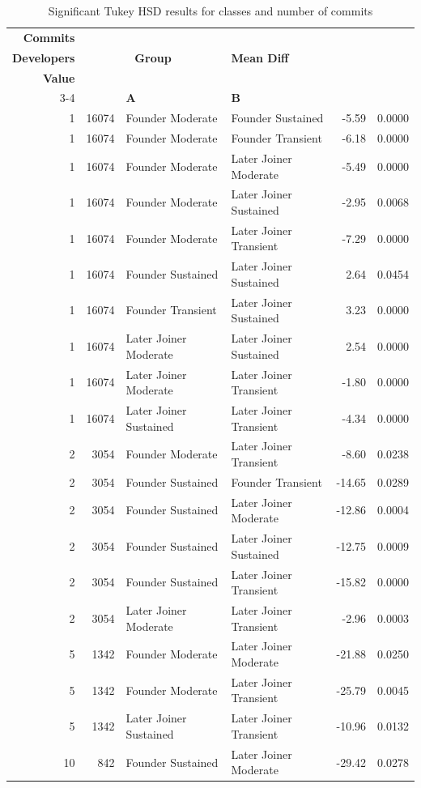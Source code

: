 \begin{table}[H]
\centering
\setlength{\tabcolsep}{2pt}
\caption[Significant Tukey HSD Results for classes]{Significant Tukey HSD results for classes and number of commits}
\begin{tabular}{r r l l r r}
\toprule
\textbf{Commits} & \makecell[t]{\textbf{Number of}\\\textbf{Developers}} & \multicolumn{2}{c}{\textbf{Group}} & \textbf{Mean Diff} & \makecell[t]{\textbf{Adj $P$}\\\textbf{Value}} \\ 
\cmidrule(lr){3-4}
 &  & \textbf{A} & \textbf{B} &  &  \\ 
\midrule
1 & 16074 & Founder Moderate & Founder Sustained & -5.59 & 0.0000 \\ 
1 & 16074 & Founder Moderate & Founder Transient & -6.18 & 0.0000 \\ 
1 & 16074 & Founder Moderate & Later Joiner Moderate & -5.49 & 0.0000 \\ 
1 & 16074 & Founder Moderate & Later Joiner Sustained & -2.95 & 0.0068 \\ 
1 & 16074 & Founder Moderate & Later Joiner Transient & -7.29 & 0.0000 \\ 
1 & 16074 & Founder Sustained & Later Joiner Sustained & 2.64 & 0.0454 \\ 
1 & 16074 & Founder Transient & Later Joiner Sustained & 3.23 & 0.0000 \\ 
1 & 16074 & Later Joiner Moderate & Later Joiner Sustained & 2.54 & 0.0000 \\ 
1 & 16074 & Later Joiner Moderate & Later Joiner Transient & -1.80 & 0.0000 \\ 
1 & 16074 & Later Joiner Sustained & Later Joiner Transient & -4.34 & 0.0000 \\ 
2 & 3054 & Founder Moderate & Later Joiner Transient & -8.60 & 0.0238 \\ 
2 & 3054 & Founder Sustained & Founder Transient & -14.65 & 0.0289 \\ 
2 & 3054 & Founder Sustained & Later Joiner Moderate & -12.86 & 0.0004 \\ 
2 & 3054 & Founder Sustained & Later Joiner Sustained & -12.75 & 0.0009 \\ 
2 & 3054 & Founder Sustained & Later Joiner Transient & -15.82 & 0.0000 \\ 
2 & 3054 & Later Joiner Moderate & Later Joiner Transient & -2.96 & 0.0003 \\ 
5 & 1342 & Founder Moderate & Later Joiner Moderate & -21.88 & 0.0250 \\ 
5 & 1342 & Founder Moderate & Later Joiner Transient & -25.79 & 0.0045 \\ 
5 & 1342 & Later Joiner Sustained & Later Joiner Transient & -10.96 & 0.0132 \\ 
10 & 842 & Founder Sustained & Later Joiner Moderate & -29.42 & 0.0278 \\ 
\bottomrule
\end{tabular}%
\label{tab:codebase_graph_latex_repository_graph_component_time_series_tukey_hsdsigclasses} 
\end{table}
